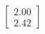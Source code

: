 \documentclass[preview]{standalone}
\begin{document}
\begin{align*}
\begin{bmatrix} 2.00 \\ 2.42 \end{bmatrix}
\end{align*}
\end{document}
